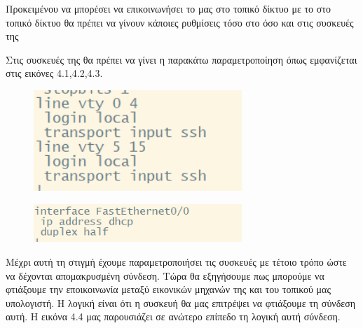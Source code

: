 \FloatBarrier

Προκειμένου να μπορέσει να επικοινωνήσει το  μας στο τοπικό δίκτυο με το  στο τοπικό δίκτυο
θα πρέπει να γίνουν κάποιες ρυθμίσεις τόσο στο  όσο και στις συσκευές της 

Στις συσκευές της  θα πρέπει να γίνει η παρακάτω παραμετροποίηση όπως εμφανίζεται στις εικόνες 4.1,4.2,4.3.

\begin{figure}[h]
	\centering
	\includegraphics[width=0.7\textwidth]{graphics/cisco_ssh_config.png}
	\caption{ }
\end{figure}

\FloatBarrier

\begin{figure}[h]
	\centering
	\includegraphics[width=0.7\textwidth]{graphics/dhcp_cisco_config.png}
	\caption{ }
\end{figure}

\FloatBarrier

Μέχρι αυτή τη στιγμή έχουμε παραμετροποιήσει τις συσκευές με τέτοιο τρόπο ώστε να δέχονται
απομακρυσμένη σύνδεση. Τώρα θα εξηγήσουμε πως μπορούμε να φτιάξουμε την εποικοινωνία μεταξύ εικονικών
μηχανών της  και του τοπικού μας υπολογιστή. Η λογική είναι ότι η συσκευή 
θα μας επιτρέψει να φτιάξουμε τη σύνδεση αυτή. Η εικόνα 4.4 μας παρουσιάζει σε ανώτερο επίπεδο τη λογική αυτή σύνδεση.

\FloatBarrier

